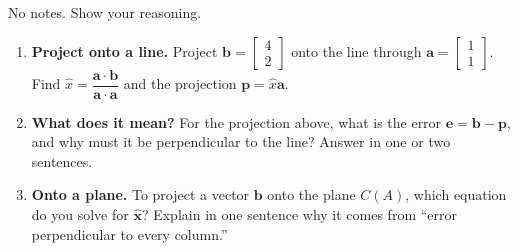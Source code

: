 \documentclass[10pt]{article}
\newcommand{\xx}{\mathbf{x}}
\newcommand{\bb}{\mathbf{b}}
\newcommand{\pp}{\mathbf{p}}
\newcommand{\ee}{\mathbf{e}}
\newcommand{\avec}{\mathbf{a}}
\begin{document}
\namedateperiod

\vspace{0.15in}

No notes. Show your reasoning.

\begin{enumerate}[leftmargin=1.8em, itemsep=15pt]
  \item \textbf{Project onto a line.} Project $\bb=\begin{bmatrix} 4 \\ 2 \end{bmatrix}$ onto the line
        through $\avec=\begin{bmatrix} 1 \\ 1 \end{bmatrix}$. Find $\hat{x}=\dfrac{\avec\cdot\bb}{\avec\cdot\avec}$
        and the projection $\pp=\hat{x}\avec$.
        \vspace{1.6cm}
  \item \textbf{What does it mean?} For the projection above, what is the error $\ee=\bb-\pp$, and why
        must it be perpendicular to the line? Answer in one or two sentences.
  \item \textbf{Onto a plane.} To project a vector $\bb$ onto the plane $C(A)$, which equation do you
        solve for $\hat{\xx}$? Explain in one sentence why it comes from ``error perpendicular to every
        column.''
\end{enumerate}
\end{document}
